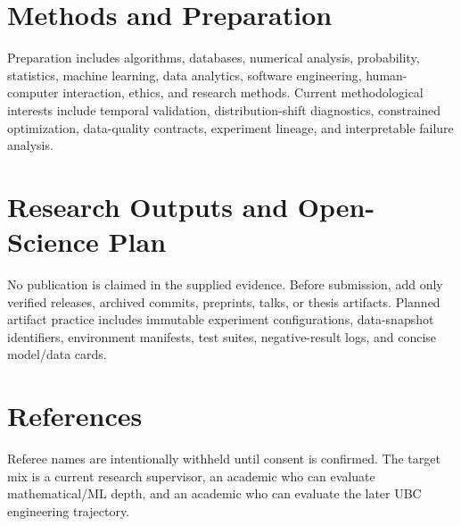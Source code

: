 \documentclass[11pt]{article}
\begin{document}
\section*{Methods and Preparation}
Preparation includes algorithms, databases, numerical analysis, probability, statistics, machine learning, data analytics, software engineering, human-computer interaction, ethics, and research methods. Current methodological interests include temporal validation, distribution-shift diagnostics, constrained optimization, data-quality contracts, experiment lineage, and interpretable failure analysis.

\section*{Research Outputs and Open-Science Plan}
No publication is claimed in the supplied evidence. Before submission, add only verified releases, archived commits, preprints, talks, or thesis artifacts. Planned artifact practice includes immutable experiment configurations, data-snapshot identifiers, environment manifests, test suites, negative-result logs, and concise model/data cards.

\section*{References}
Referee names are intentionally withheld until consent is confirmed. The target mix is a current research supervisor, an academic who can evaluate mathematical/ML depth, and an academic who can evaluate the later UBC engineering trajectory.
\end{document}

